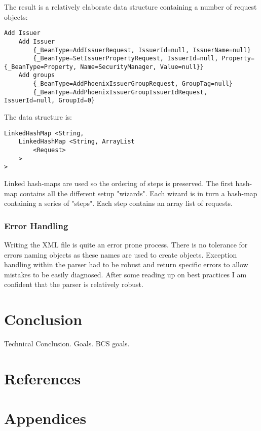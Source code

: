 \documentclass[a4paper, 11pt, titlepage]{article}
\begin{document}
The result is a relatively elaborate data structure containing a number of request objects: 
 
\begin{verbatim} 
Add Issuer 
	Add Issuer 
		{_BeanType=AddIssuerRequest, IssuerId=null, IssuerName=null} 
		{_BeanType=SetIssuerPropertyRequest, IssuerId=null, Property={_BeanType=Property, Name=SecurityManager, Value=null}} 
	Add groups 
		{_BeanType=AddPhoenixIssuerGroupRequest, GroupTag=null} 
		{_BeanType=AddPhoenixIssuerGroupIssuerIdRequest, IssuerId=null, GroupId=0} 
\end{verbatim} 
 
The data structure is: 
 
\begin{verbatim} 
LinkedHashMap <String,  
    LinkedHashMap <String, ArrayList 
        <Request> 
    > 
> 
\end{verbatim} 
 
Linked hash-maps are used so the ordering of steps is preserved. The first hash-map contains all the different setup "wizards". Each wizard is in turn a hash-map containing a series of "steps". Each step contains an array list of requests. 
\subsubsection{Error Handling} 
 
Writing the XML file is quite an error prone process. There is no tolerance for errors naming objects as these names are used to create objects. Exception handling within the parser had to be robust and return specific errors to allow mistakes to be easily diagnosed. After some reading up on best practices I am confident that the parser is relatively robust. 
\cite{http://www.wikijava.org/wiki/10_best_practices_with_Exceptions Is it appropriate to link a wiki?} 
 
\section{Conclusion} 
Technical Conclusion. Goals. BCS goals. 
\section{References} 
 
 
 
\section{Appendices} 
 
 
 
 
\end{document}
